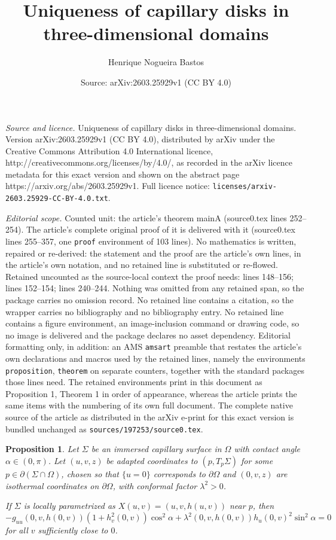 \documentclass[10pt,a4paper]{amsart}
\title{Uniqueness of capillary disks in three-dimensional domains}
\author{Henrique Nogueira Bastos}
\date{Source: arXiv:2603.25929v1 (CC BY 4.0)}
\newtheorem{proposition}{Proposition}
\begin{document}
\maketitle

\noindent\emph{Source and licence.} Uniqueness of capillary disks in three-dimensional domains. Version arXiv:2603.25929v1 (CC BY 4.0), distributed by arXiv under the Creative Commons Attribution 4.0 International licence, http://creativecommons.org/licenses/by/4.0/, as recorded in the arXiv licence metadata for this exact version and shown on the abstract page https://arxiv.org/abs/2603.25929v1. Full licence notice: \texttt{licenses/arxiv-2603.25929-CC-BY-4.0.txt}.\par\smallskip

\noindent\textit{Editorial scope.} Counted unit: the article's theorem mainA (source0.tex lines 252--254). The article's complete original proof of it is delivered with it (source0.tex lines 255--357, one \texttt{proof} environment of 103 lines). No mathematics is written, repaired or re-derived: the statement and the proof are the article's own lines, in the article's own notation, and no retained line is substituted or re-flowed.  Retained uncounted as the source-local context the proof needs: lines 148--156; lines 152--154; lines 240--244.  Nothing was omitted from any retained span, so the package carries no omission record.  No retained line contains a citation, so the wrapper carries no bibliography and no bibliography entry.  No retained line contains a figure environment, an image-inclusion command or drawing code, so no image is delivered and the package declares no asset dependency.  Editorial formatting only, in addition: an AMS \texttt{amsart} preamble that restates the article's own declarations and macros used by the retained lines, namely the environments \texttt{proposition}, \texttt{theorem} on separate counters, together with the standard packages those lines need.  The retained environments print in this document as Proposition 1, Theorem 1 in order of appearance, whereas the article prints the same items with the numbering of its own full document.  The complete native source of the article as distributed in the arXiv e-print for this exact version is bundled unchanged as \texttt{sources/197253/source0.tex}.
\begin{proposition}\label{prop:condição de bordo}
    Let $\Sigma$ be an immersed capillary surface in $\Omega$ with contact angle $\alpha\in(0,\pi)$. Let $(u,v,z)$ be adapted coordinates  to $(p,T_p\Sigma)$ for some $p\in \partial(\Sigma\cap  \Omega)$, chosen so that $\{u=0\}$ corresponds to $\partial \Omega$ and $(0,v,z)$ are isothermal coordinates on $\partial \Omega$, with conformal factor $\lambda^2>0$. 
    
    If $\Sigma$ is locally parametrized as $X(u,v)=(u,v,h(u,v))$ near $p$, then
    \begin{equation}\label{eq:prop2.1}
     -g_{uu}(0,v,h(0,v))(1+h_v^2(0,v))\cos^2\alpha+\lambda^2(0,v,h(0,v)) h_u(0,v)^2\sin^2\alpha=0
    \end{equation}
    for all $v$ sufficiently close to $0$.
\end{proposition}
\end{document}
